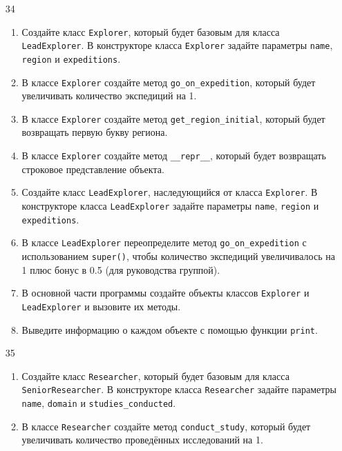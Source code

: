 \begin{enumerate}
\item[34] 
\begin{enumerate}
    \item Создайте класс \texttt{Explorer}, который будет базовым для класса \texttt{LeadExplorer}. В конструкторе класса \texttt{Explorer} задайте параметры \texttt{name}, \texttt{region} и \texttt{expeditions}.
    
    \item В классе \texttt{Explorer} создайте метод \texttt{go\_on\_expedition}, который будет увеличивать количество экспедиций на 1.
    
    \item В классе \texttt{Explorer} создайте метод \texttt{get\_region\_initial}, который будет возвращать первую букву региона.
    
    \item В классе \texttt{Explorer} создайте метод \texttt{\_\_repr\_\_}, который будет возвращать строковое представление объекта.
    
    \item Создайте класс \texttt{LeadExplorer}, наследующийся от класса \texttt{Explorer}. В конструкторе класса \texttt{LeadExplorer} задайте параметры \texttt{name}, \texttt{region} и \texttt{expeditions}.
    
    \item В классе \texttt{LeadExplorer} переопределите метод \texttt{go\_on\_expedition} с использованием \texttt{super()}, чтобы количество экспедиций увеличивалось на 1 плюс бонус в 0.5 (для руководства группой).
    
    \item В основной части программы создайте объекты классов \texttt{Explorer} и \texttt{LeadExplorer} и вызовите их методы.
    
    \item Выведите информацию о каждом объекте с помощью функции \texttt{print}.
\end{enumerate}

\item[35] 
\begin{enumerate}
    \item Создайте класс \texttt{Researcher}, который будет базовым для класса \texttt{SeniorResearcher}. В конструкторе класса \texttt{Researcher} задайте параметры \texttt{name}, \texttt{domain} и \texttt{studies\_conducted}.
    
    \item В классе \texttt{Researcher} создайте метод \texttt{conduct\_study}, который будет увеличивать количество проведённых исследований на 1.
    

\end{enumerate}
\end{enumerate}
